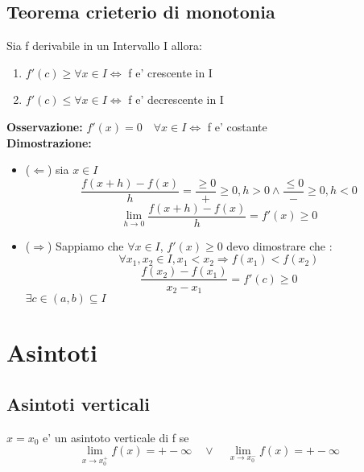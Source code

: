 \documentclass{article}
\begin{document}
        \subsection{Teorema crieterio di monotonia}
        \begin{flushleft}
          Sia f derivabile in un Intervallo I allora:
          \begin{enumerate}
            \item $f'(c) \geq \forall x \in I \iff$ f e' crescente in I
            \item $f'(c) \leq \forall x \in I \iff$ f e' decrescente in I
          \end{enumerate}
          \textbf{Osservazione:} $f'(x)=0\quad \forall x \in I \iff $ f e' costante \\
          \textbf{Dimostrazione:}
          \begin{itemize}
            \item ($\Leftarrow$) sia $x\in I$
              \begin{equation}
                \frac{f(x+h)-f(x)}{h}= \frac{\geq 0}{+}\geq 0, h>0 \land \frac{\leq 0}{-}\geq 0, h<0 
              \end{equation}
           \begin{equation}
             \lim_{h \to 0} \frac{f(x+h)-f(x)}{h}= f'(x) \geq 0
           \end{equation}
         \item ($\Rightarrow$) Sappiamo che $\forall x \in I$, $f'(x) \geq 0$ devo dimostrare che :
           \begin{equation}
            \forall x_1,x_2 \in I, x_1<x_2 \Rightarrow f(x_1) < f(x_2) 
           \end{equation}
           \begin{equation}
             \frac{f(x_2)-f(x_1)}{x_2-x_1} = f'(c)\geq 0
           \end{equation}
              $\exists c \in (a,b) \subseteq I$
          \end{itemize}
        \end{flushleft}
        \section{Asintoti}
        \subsection{Asintoti verticali}
        \begin{flushleft}
          $x=x_0$ e' un asintoto verticale di f se
          \begin{equation}
            \lim_{ x \to x_0^+} f(x)= +- \infty \quad \lor \quad \lim_{ x \to x_0^-} f(x)= +- \infty 
          \end{equation}
        \end{flushleft}
\end{document}
